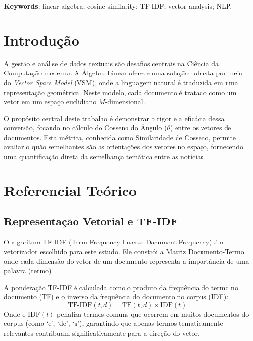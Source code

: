 \documentclass[a4paper, 12pt]{article}
\begin{document}
\vspace{0.5cm}
\noindent\textbf{Keywords}: linear algebra; cosine similarity; TF-IDF; vector analysis; NLP.


\section{Introdução}

A gestão e análise de dados textuais são desafios centrais na Ciência da Computação moderna. A Álgebra Linear oferece uma solução robusta por meio do \textit{Vector Space Model} (VSM), onde a linguagem natural é traduzida em uma representação geométrica. Neste modelo, cada documento é tratado como um vetor em um espaço euclidiano $M$-dimensional.

O propósito central deste trabalho é demonstrar o rigor e a eficácia dessa conversão, focando no cálculo do Cosseno do Ângulo ($\theta$) entre os vetores de documentos. Esta métrica, conhecida como Similaridade de Cosseno, permite avaliar o quão semelhantes são as orientações dos vetores no espaço, fornecendo uma quantificação direta da semelhança temática entre as notícias.

\section{Referencial Teórico}

\subsection{Representação Vetorial e TF-IDF}

O algoritmo TF-IDF (Term Frequency-Inverse Document Frequency) é o vetorizador escolhido para este estudo. Ele constrói a Matriz Documento-Termo onde cada dimensão do vetor de um documento representa a importância de uma palavra (termo).

A ponderação TF-IDF é calculada como o produto da frequência do termo no documento (TF) e o inverso da frequência do documento no corpus (IDF):
$$
\text{TF-IDF}(t, d) = \text{TF}(t, d) \times \text{IDF}(t)
$$
Onde o $\text{IDF}(t)$ penaliza termos comuns que ocorrem em muitos documentos do corpus (como ‘e’, ‘de’, ‘a’), garantindo que apenas termos tematicamente relevantes contribuam significativamente para a direção do vetor.
\end{document}
